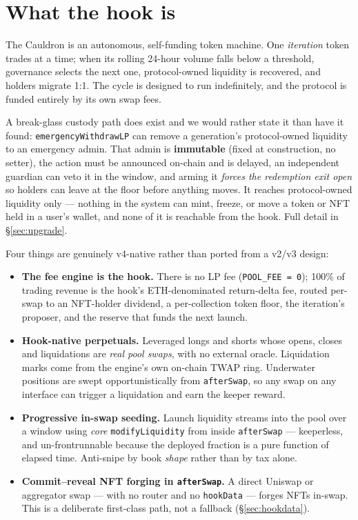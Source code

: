 \documentclass[11pt,a4paper]{article}
\newcommand{\code}[1]{\texttt{\small #1}}
\begin{document}
\section{What the hook is}
\label{sec:diff}

The Cauldron is an autonomous, self-funding token machine. One \emph{iteration}
token trades at a time; when its rolling 24-hour volume falls below a threshold,
governance selects the next one, protocol-owned liquidity is recovered, and
holders migrate 1:1. The cycle is designed to run indefinitely, and the protocol
is funded entirely by its own swap fees.

A break-glass custody path does exist and we would rather state it than have it
found: \code{emergencyWithdrawLP} can remove a generation's protocol-owned
liquidity to an emergency admin. That admin is \textbf{immutable} (fixed at
construction, no setter), the action must be announced on-chain and is delayed, an
independent guardian can veto it in the window, and arming it \emph{forces the
redemption exit open} so holders can leave at the floor before anything moves. It
reaches protocol-owned liquidity only --- nothing in the system can mint, freeze,
or move a token or NFT held in a user's wallet, and none of it is reachable from
the hook. Full detail in \S\ref{sec:upgrade}.

Four things are genuinely v4-native rather than ported from a v2/v3 design:

\begin{itemize}
\item \textbf{The fee engine is the hook.} There is no LP fee
(\code{POOL\_FEE = 0}); 100\% of trading revenue is the hook's ETH-denominated
return-delta fee, routed per-swap to an NFT-holder dividend, a per-collection
token floor, the iteration's proposer, and the reserve that funds the next
launch.
\item \textbf{Hook-native perpetuals.} Leveraged longs and shorts whose opens,
closes and liquidations are \emph{real pool swaps}, with no external oracle.
Liquidation marks come from the engine's own on-chain TWAP ring. Underwater
positions are swept opportunistically from \code{afterSwap}, so any swap on any
interface can trigger a liquidation and earn the keeper reward.
\item \textbf{Progressive in-swap seeding.} Launch liquidity streams into the
pool over a window using \emph{core} \code{modifyLiquidity} from inside
\code{afterSwap} --- keeperless, and un-frontrunnable because the deployed
fraction is a pure function of elapsed time. Anti-snipe by book \emph{shape}
rather than by tax alone.
\item \textbf{Commit--reveal NFT forging in \code{afterSwap}.} A direct Uniswap
or aggregator swap --- with no router and no \code{hookData} --- forges NFTs
in-swap. This is a deliberate first-class path, not a fallback (\S\ref{sec:hookdata}).
\end{itemize}
\end{document}
